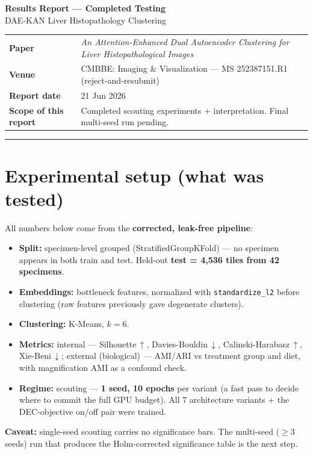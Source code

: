 \documentclass[11pt,a4paper]{article}
\newcommand{\up}{$\uparrow$}
\newcommand{\dn}{$\downarrow$}
\begin{document}
\begin{center}
{\LARGE\bfseries Results Report --- Completed Testing}\\[4pt]
{\large DAE-KAN Liver Histopathology Clustering}\\[10pt]
\end{center}

\noindent
\begin{tabular}{@{}ll@{}}
\textbf{Paper} & \emph{An Attention-Enhanced Dual Autoencoder Clustering for Liver Histopathological Images} \\
\textbf{Venue} & CMBBE: Imaging \& Visualization --- MS 252387151.R1 (reject-and-resubmit) \\
\textbf{Report date} & 21 Jun 2026 \\
\textbf{Scope of this report} & Completed scouting experiments + interpretation. Final multi-seed run pending. \\
\end{tabular}

\vspace{6pt}\hrule\vspace{8pt}

\section{Experimental setup (what was tested)}
All numbers below come from the \textbf{corrected, leak-free pipeline}:
\begin{itemize}
\item \textbf{Split:} specimen-level grouped (StratifiedGroupKFold) --- no specimen appears in both train and test. Held-out \textbf{test = 4{,}536 tiles from 42 specimens}.
\item \textbf{Embeddings:} bottleneck features, normalized with \texttt{standardize\_l2} before clustering (raw features previously gave degenerate clusters).
\item \textbf{Clustering:} K-Means, $k=6$.
\item \textbf{Metrics:} internal --- Silhouette\,\up, Davies-Bouldin\,\dn, Calinski-Harabasz\,\up, Xie-Beni\,\dn; external (biological) --- AMI/ARI vs treatment group and diet, with magnification AMI as a confound check.
\item \textbf{Regime:} scouting --- \textbf{1 seed, 10 epochs} per variant (a fast pass to decide where to commit the full GPU budget). All 7 architecture variants + the DEC-objective on/off pair were trained.
\end{itemize}
\textbf{Caveat:} single-seed scouting carries no significance bars. The multi-seed
($\geq$3 seeds) run that produces the Holm-corrected significance table is the next step.
\end{document}
